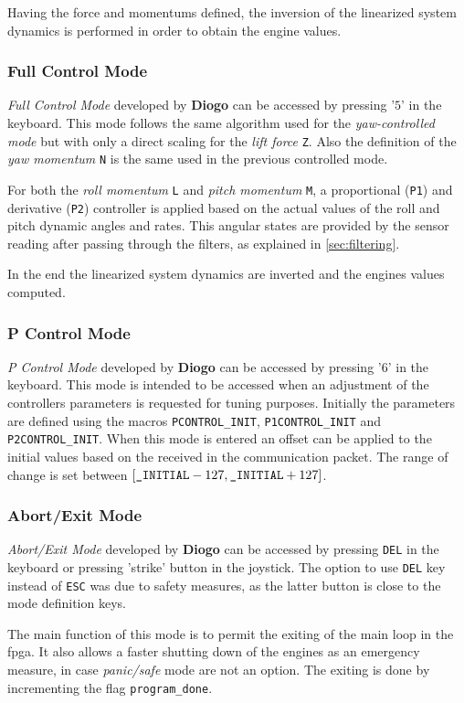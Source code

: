 \documentclass{article}
\begin{document}
Having the force and momentums defined, the inversion of the linearized system dynamics is performed in order to obtain the engine values. 
\subsubsection{Full Control Mode}
\textit{Full Control Mode} developed by \textbf{Diogo} can be accessed by pressing '$5$' in the keyboard. This mode follows the same algorithm used for the \textit{yaw-controlled mode} but with only a direct scaling for the \textit{lift force} \texttt{Z}. Also the definition of the \textit{yaw momentum} \texttt{N} is the same used in the previous controlled mode. 

For both the \textit{roll momentum} \texttt{L} and \textit{pitch momentum} \texttt{M}, a proportional (\texttt{P1}) and derivative (\texttt{P2}) controller is applied based on the actual values of the roll and pitch dynamic angles and rates. This angular states are provided by the sensor reading after passing through the filters, as explained in \ref{sec:filtering}.

In the end the linearized system dynamics are inverted and the engines values computed.
\subsubsection{P Control Mode}
\textit{P Control Mode} developed by \textbf{Diogo} can be accessed by pressing '$6$' in the keyboard. This mode is intended to be accessed when an adjustment of the controllers parameters is requested for tuning purposes. Initially the parameters are defined using the macros \texttt{PCONTROL\_INIT}, \texttt{P1CONTROL\_INIT} and \texttt{P2CONTROL\_INIT}. When this mode is entered an offset can be applied to the initial values based on the received in the communication packet. The range of change is set between $[\text{\texttt{\_INITIAL}}-127,\text{\texttt{\_INITIAL}}+127]$.
\subsubsection{Abort/Exit Mode}
\textit{Abort/Exit Mode} developed by \textbf{Diogo} can be accessed by pressing \texttt{DEL} in the keyboard or pressing 'strike' button in the joystick. The option to use \texttt{DEL} key instead of \texttt{ESC} was due to safety measures, as the latter button is close to the mode definition keys. 

The main function of this mode is to permit the exiting of the main loop in the fpga. It also allows a faster shutting down of the engines as an emergency measure, in case \textit{panic/safe} mode are not an option. The exiting is done by incrementing the flag \texttt{program\_done}.
\end{document}
